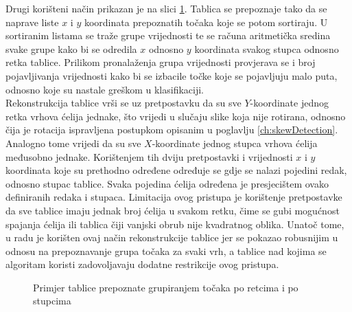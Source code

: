 \documentclass[times, utf8, zavrsni, numeric]{fer}
\begin{document}
Drugi korišteni način prikazan je na slici \ref{fig:tableV2}.
Tablica se prepoznaje tako da se naprave liste $x$ i $y$ koordinata prepoznatih točaka koje se potom sortiraju.
U sortiranim listama se traže grupe vrijednosti te se računa aritmetička sredina svake grupe kako bi se odredila $x$ odnosno $y$ koordinata svakog stupca odnosno retka tablice. 
Prilikom pronalaženja grupa vrijednosti provjerava se i broj pojavljivanja vrijednosti kako bi se izbacile točke koje se pojavljuju malo puta, odnosno koje su nastale greškom u klasifikaciji.\\

Rekonstrukcija tablice vrši se uz pretpostavku da su sve $Y$-koordinate jednog retka vrhova ćelija jednake, što vrijedi u slučaju slike koja nije rotirana, odnosno čija je rotacija ispravljena postupkom opisanim u poglavlju \ref{ch:skewDetection}.
Analogno tome vrijedi da su sve $X$-koordinate jednog stupca vrhova ćelija međusobno jednake.
Korištenjem tih dviju pretpostavki i vrijednosti $x$ i $y$ koordinata koje su prethodno određene određuje se gdje se nalazi pojedini redak, odnosno stupac tablice.
Svaka pojedina ćelija određena je presjecištem ovako definiranih redaka i stupaca.
Limitacija ovog pristupa je korištenje pretpostavke da sve tablice imaju jednak broj ćelija u svakom retku, čime se gubi mogućnost spajanja ćelija ili tablica čiji vanjski obrub nije kvadratnog oblika.
Unatoč tome, u radu je korišten ovaj način rekonstrukcije tablice jer se pokazao robusnijim u odnosu na prepoznavanje grupa točaka za svaki vrh, a tablice nad kojima se algoritam koristi zadovoljavaju dodatne restrikcije ovog pristupa.\\

\begin{figure}[ht!]
    \centering
    \captionsetup{justification=centering}
    \caption{Primjer tablice prepoznate grupiranjem točaka po retcima i po stupcima}
    \label{fig:tableV2}
\end{figure}
\end{document}
